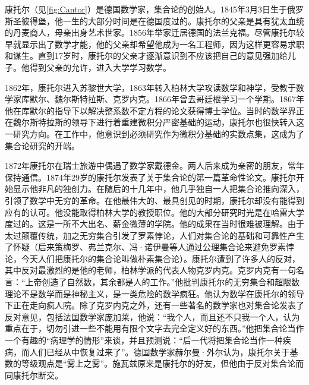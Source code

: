 \documentclass[b5paper]{ctexart}
\begin{document}
\begin{mdframed}
康托尔（见\cref{fig:Cantor}）是德国数学家，集合论的创始人。1845年3月3日生于俄罗斯圣彼得堡，他一生的大部分时间是在德国度过的。康托尔的父亲是具有犹太血统的丹麦商人，母亲出身艺术世家。1856年举家迁居德国的法兰克福。尽管康托尔较早就显示出了数学才能，他的父亲却希望他成为一名工程师，因为这样更容易求职和谋生。直到17岁时，康托尔的父亲才逐渐意识到不应该把自己的意见强加给儿子。他得到父亲的允许，进入大学学习数学。

1862年，康托尔进入苏黎世大学，1863年转入柏林大学攻读数学和神学，受教于数学家库默尔、魏尔斯特拉斯、克罗内克。1866年曾去哥廷根学习一个学期。1867年他在库默尔的指导下以解决整系数不定方程的论文获得博士学位。当时的数学界正在魏尔斯特拉斯的领导下进行着重建微积分严密基础的运动，康托尔也很快转入这一研究方向。在工作中，他意识到必须研究作为微积分基础的实数点集，这成为了集合论研究的开端。

1872年康托尔在瑞士旅游中偶遇了数学家戴德金。两人后来成为亲密的朋友，常年保持通信。1874年29岁的康托尔发表了关于集合论的第一篇革命性论文。康托尔开始显示他非凡的独创力。在随后的十几年中，他几乎独自一人把集合论推向深入，引领了数学中无穷的革命。在他最伟大的、最具创见的时期，康托尔却没有能得到应有的认可。他没能取得柏林大学的教授职位。他的大部分研究时光是在哈雷大学度过的。这是一所不大出名、薪金微薄的学院。他的成果在当时很难被理解。由于太过颠覆传统，加之无穷集合引发了罗素悖论，人们对集合论的基础和可靠性产生了怀疑（后来策梅罗、弗兰克尔、冯·诺伊曼等人通过公理集合论来避免罗素悖论，今天人们把康托尔的集合论叫做朴素集合论）。康托尔遭到了许多人的反对，其中反对最激烈的是他的老师，柏林学派的代表人物克罗内克。克罗内克有一句名言：“上帝创造了自然数，其余都是人的工作。”他批判康托尔的无穷集合和超限数理论不是数学而是神秘主义，是一类危险的数学疯狂。他认为数学在康托尔的领导下正在走向疯人院。除了克罗内克之外，还有一些著名的数学家也对集合论发表了反对意见，包括法国数学家庞加莱，他说：“我个人，而且还不只我一个人，认为重点在于，切勿引进一些不能用有限个文字去完全定义好的东西。”他把集合论当作一个有趣的“病理学的情形”来谈，并且预测说：“后一代将把集合论当作一种疾病，而人们已经从中恢复过来了”。德国数学家赫尔曼·外尔认为，康托尔关于基数的等级观点是“雾上之雾”。施瓦兹原来是康托尔的好友，但他由于反对集合论而同康托尔断交。


\end{mdframed}
\end{document}
